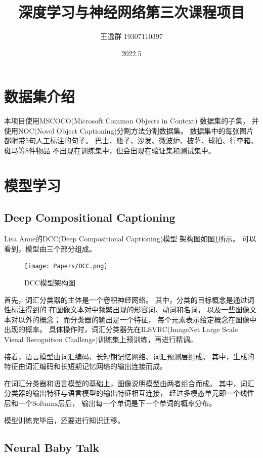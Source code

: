\documentclass[12pt]{article}
\title{深度学习与神经网络第三次课程项目}
\author{王逸群 19307110397}
\date{2022.5}
\begin{document}
\maketitle

\section{数据集介绍}

本项目使用MSCOCO(Microsoft Common Objects in Context)
数据集的子集，
并使用NOC(Novel Object Captioning)分割方法分割数据集。
数据集中的每张图片都附带5句人工标注的句子。
巴士、瓶子、沙发、微波炉、披萨、球拍、行李箱、斑马等8件物品
不出现在训练集中，但会出现在验证集和测试集中。

\section{模型学习}

\subsection{Deep Compositional Captioning}

Lisa Anne的DCC(Deep Compositional Captioning)模型
架构图如图\ref{fig:DCC}所示。
可以看到，模型由三个部分组成。 

\begin{figure}
	\centering
	\texttt{[image: Papers/DCC.png]}
	\caption{DCC模型架构图}
	\label{fig:DCC}
\end{figure}

首先，词汇分类器的主体是一个卷积神经网络。
其中，分类的目标概念是通过词性标注得到的
在图像文本对中频繁出现的形容词、动词和名词，
以及一些图像文本对以外的概念；
而分类器的输出是一个特征，
每个元素表示给定概念在图像中出现的概率。
具体操作时，词汇分类器先在ILSVRC(ImageNet Large Scale Visual Recognition Challenge)训练集上预训练，再进行精调。

接着，语言模型由词汇编码、长短期记忆网络、词汇预测层组成。
其中，生成的特征由词汇编码和长短期记忆网络的输出连接而成。

在词汇分类器和语言模型的基础上，图像说明模型由两者组合而成。
其中，词汇分类器的输出特征与语言模型的输出特征相互连接，
经过多模态单元即一个线性层和一个Softmax层后，
输出每一个单词是下一个单词的概率分布。

模型训练完毕后，还要进行知识迁移。

\subsection{Neural Baby Talk}
\end{document}
